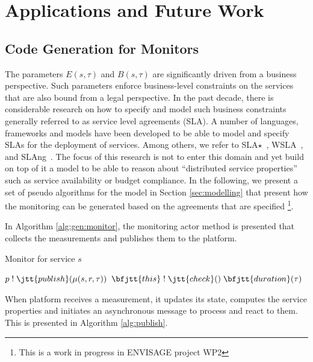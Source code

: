 
\section{Applications and Future Work} %
\label{sec:application}

\subsection{Code Generation for Monitors}

The parameters $E(s,\tau)$ and $B(s,\tau)$ are significantly driven from a business perspective.
Such parameters enforce business-level constraints on the services that are also bound from a legal perspective.
In the past decade, there is considerable research on how to specify and model such business constraints generally referred to as service level agreements (SLA).
A number of languages, frameworks and models have been developed to be able to model and specify SLAs for the deployment of services.
Among others, we refer to SLA$\star$~\cite{kearney2010sla}, WSLA~\cite{keller2003wsla}, and SLAng~\cite{lamanna2003slang}.
The focus of this research is not to enter this domain and yet build on top of it a model to be able to reason about ``distributed service properties'' such as service availability or budget compliance. 
In the following, we present a set of pseudo algorithms for the model in Section \ref{sec:modelling} that present how the monitoring can be generated based on the agreements that are specified
\footnote{This is a work in progress in ENVISAGE project WP2}. 

In Algorithm \ref{alg:gen:monitor}, the monitoring actor method  is presented that collects the measurements and publishes them to the platform.

% 
\begin{algorithm}
\caption{Monitor for service $s$}
\label{alg:gen:monitor}
\begin{algorithmic}
    \State $p \; ! \; \jtt{publish}(\mu(s,r,\tau))$
    \State $\bfjtt{this} \; ! \; \jtt{check}() \; \bfjtt{duration}(\tau)$
  \EndFor
\EndFunction
\end{algorithmic}
\end{algorithm}
% 

When platform receives a measurement, it updates its state, computes the service properties and initiates an asynchronous message to process and react to them.
This is presented in Algorithm \ref{alg:publish}.

